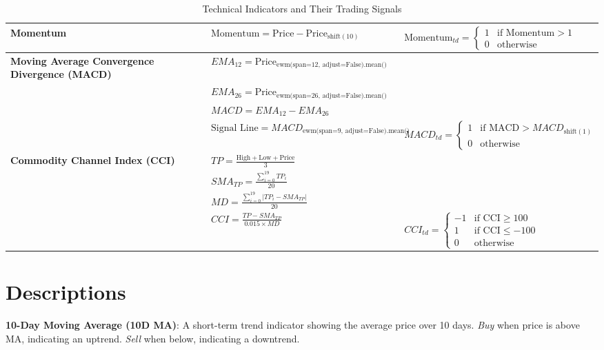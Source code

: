 \documentclass{article}
\begin{document}
\begin{table}[h!]
\begin{tabular}{| m{3cm} | m{8cm} | m{5cm} |}
\textbf{Momentum} & 
$\text{Momentum} = \text{Price} - \text{Price}_{\text{shift}(10)}$ &
$\text{Momentum}_{td} = \begin{cases} 
1 & \text{if Momentum} > 1 \\
0 & \text{otherwise}
\end{cases}$ \\
\hline

\textbf{Moving Average Convergence Divergence (MACD)} & 
$EMA_{12} = \text{Price}_{\text{ewm(span=12, adjust=False).mean()}}$ \\
& $EMA_{26} = \text{Price}_{\text{ewm(span=26, adjust=False).mean()}}$ \\
& $MACD = EMA_{12} - EMA_{26}$ \\
& $\text{Signal Line} = MACD_{\text{ewm(span=9, adjust=False).mean()}}$ & 
$MACD_{td} = \begin{cases} 
1 & \text{if MACD} > MACD_{\text{shift}(1)} \\
0 & \text{otherwise}
\end{cases}$ \\
\hline

\textbf{Commodity Channel Index (CCI)} & 
$TP = \frac{\text{High} + \text{Low} + \text{Price}}{3}$ \\
& $SMA_{TP} = \frac{\sum_{i=0}^{19} TP_i}{20}$ \\
& $MD = \frac{\sum_{i=0}^{19} \left| TP_i - SMA_{TP} \right|}{20}$ \\
& $CCI = \frac{TP - SMA_{TP}}{0.015 \times MD}$ &
$CCI_{td} = \begin{cases} 
-1 & \text{if CCI} \geq 100 \\
1 & \text{if CCI} \leq -100 \\
0 & \text{otherwise}
\end{cases}$ \\
\hline

\end{tabular}
\caption{Technical Indicators and Their Trading Signals}
\end{table}

\section{Descriptions}

\textbf{10-Day Moving Average (10D MA)}: A short-term trend indicator showing the average price over 10 days. \textit{Buy} when price is above MA, indicating an uptrend. \textit{Sell} when below, indicating a downtrend.
\end{document}
